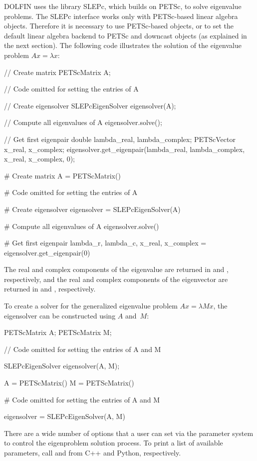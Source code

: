 DOLFIN uses the library SLEPc, which builds on PETSc, to solve eigenvalue
problems. The SLEPc interface works only with PETSc-based linear algebra
objects.  Therefore it is necessary to use PETSc-based objects, or to
set the default linear algebra backend to PETSc and downcast objects
(as explained in the next section). The following code illustrates
the solution of the eigenvalue problem $Ax = \lambda x$:
\begin{c++}
// Create matrix
PETScMatrix A;

// Code omitted for setting the entries of A

// Create eigensolver
SLEPcEigenSolver eigensolver(A);

// Compute all eigenvalues of A
eigensolver.solve();

// Get first eigenpair
double lambda_real, lambda_complex;
PETScVector x_real, x_complex;
eigensolver.get_eigenpair(lambda_real, lambda_complex, x_real, x_complex, 0);
\end{c++}
\begin{python}
# Create matrix
A = PETScMatrix()

# Code omitted for setting the entries of A

# Create eigensolver
eigensolver = SLEPcEigenSolver(A)

# Compute all eigenvalues of A
eigensolver.solve()

# Get first eigenpair
lambda_r, lambda_c, x_real, x_complex = eigensolver.get_eigenpair(0)
\end{python}
The real and complex components of the eigenvalue are returned in
 and , respectively, and the
real and complex components of the eigenvector are
returned in  and , respectively.

To create a solver for the generalized eigenvalue problem $Ax = \lambda Mx$, the
eigensolver can be constructed using $A$ and~$M$:

\begin{c++}
PETScMatrix A;
PETScMatrix M;

// Code omitted for setting the entries of A and M

SLEPcEigenSolver eigensolver(A, M);
\end{c++}
\begin{python}
A = PETScMatrix()
M = PETScMatrix()

# Code omitted for setting the entries of A and M

eigensolver = SLEPcEigenSolver(A, M)
\end{python}
There are a wide number of options that a user can set via the
parameter system to control the eigenproblem solution process. To
print a list of available parameters, call
 and
 from C++ and Python,
respectively.

